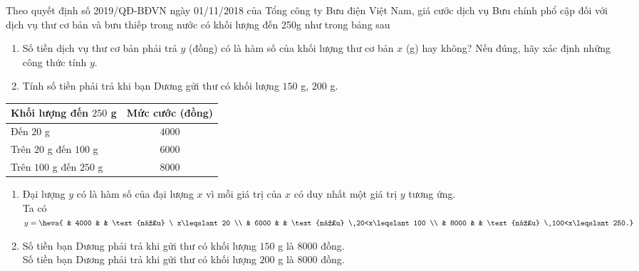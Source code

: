 \begin{bt}%
	Theo quyết định số 2019/QĐ-BĐVN ngày 01/11/2018 của Tổng công ty Bưu điện Việt Nam, giá cước dịch vụ Bưu chính phổ cập đối với dịch vụ thư cơ bản và bưu thiếp trong nước có khối lượng đến 250g như trong bảng sau
	\immini
	{
		\begin{enumerate}
			\item Số tiền dịch vụ thư cơ bản phải trả $y$ (đồng) có là hàm số của khối lượng thư cơ bản $x$ (g) hay không? Nếu đúng, hãy xác định những công thức tính $y$.
			\item Tính số tiền phải trả khi bạn Dương gửi thư có khối lượng $150$ g, $200$ g.
		\end{enumerate}
	}
	{
		\begin{tabular}{|l|c|}
			\hline
			Khối lượng đến $250$ g   & Mức cước (đồng) \\
			\hline
			Đến $20$ g               & $4 000$         \\
			\hline
			Trên $20$ g đến $100$ g  & $6 000$         \\
			\hline
			Trên $100$ g đến $250$ g & $8 000$         \\
			\hline
		\end{tabular}
	}
	\loigiai
	{
		\begin{enumerate}
			\item Đại lượng $y$ có là hàm số của đại lượng $x$ vì mỗi giá trị của $x$ có duy nhất một giá trị $y$ tương ứng. \\
			      Ta có $y=\heva{ & 4000 & & \text{nếu} \ x\leqslant20 \\ & 6000 & & \text{nếu} \ 20<x\leqslant100 \\ & 8000 & & \text{nếu} \ 100<x\leqslant250.}$ \\
			\item Số tiền bạn Dương phải trả khi gửi thư có khối lượng $150$ g là $8000$ đồng. \\
			      Số tiền bạn Dương phải trả khi gửi thư có khối lượng $200$ g là $8000$ đồng.
		\end{enumerate}
	}
\end{bt}

